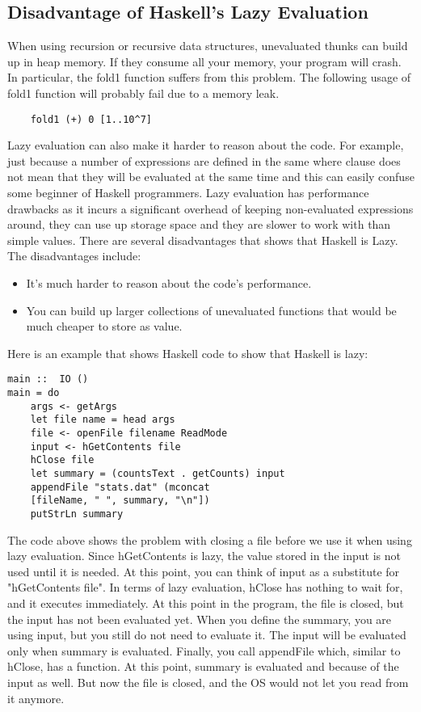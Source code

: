 \documentclass{article}
\begin{document}
\subsection{Disadvantage of Haskell's Lazy Evaluation}
When using recursion or recursive data structures, unevaluated thunks can build up in heap memory. If they consume all your memory, your program will crash. In particular, the fold1 function suffers from this problem. The following usage of fold1 function will probably fail due to a memory leak.
\begin{lstlisting}
	fold1 (+) 0 [1..10^7]
\end{lstlisting}
Lazy evaluation can also make it harder to reason about the code. For example, just because a number of expressions are defined in the same where clause does not mean that they will be evaluated at the same time and this can easily confuse some beginner of Haskell programmers.
\newline \newline Lazy evaluation has performance drawbacks as it incurs a significant overhead of keeping non-evaluated expressions around, they can use up storage space and they are slower to work with than simple values.
\newline \newline There are several disadvantages that shows that Haskell is Lazy. The disadvantages include:
\begin{itemize}
  \item It's much harder to reason about the code's performance.
  \item You can build up larger collections of unevaluated functions that would be much cheaper to store as value.
\end{itemize}
 Here is an example that shows Haskell code to show that Haskell is lazy:
\begin{lstlisting}
main ::  IO ()
main = do
	args <- getArgs
	let file name = head args
	file <- openFile filename ReadMode
	input <- hGetContents file
	hClose file
	let summary = (countsText . getCounts) input
	appendFile "stats.dat" (mconcat
	[fileName, " ", summary, "\n"])
	putStrLn summary
\end{lstlisting}
The code above shows the problem with closing a file before we use it when using lazy evaluation.
\newline \newline Since hGetContents is lazy, the value stored in the input is not used until it is needed. At this point, you can think of input as a substitute for "hGetContents file".
In terms of lazy evaluation, hClose has nothing to wait for, and it executes immediately. At this point in the program, the file is closed, but the input has not been evaluated yet.
When you define the summary, you are using input, but you still do not need to evaluate it. The input will be evaluated only when summary is evaluated. 
Finally, you call appendFile which, similar to hClose, has a function. At this point, summary is evaluated and because of the input as well. But now the file is closed, and the OS would not let you read from it anymore.
\end{document}
